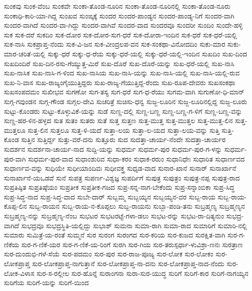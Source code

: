 ಸುಂಕವು
ಸುಂಕ-ವೆಂಬ
ಸುಂಕವೇ
ಸುಂಕಾ-ತೊಂಡ-ನೂರಿನ
ಸುಂಕಾ-ತೊಂಡ-ನೂರಿನಲ್ಲಿ
ಸುಂಕಾ-ತೊಂಡ-ನೂರು
ಸುಂಕಾಧಿ-ಕಾರಿ-ಯಾ-ಗಿದ್ದ
ಸುಂಖವ
ಸುಂಙ್ಕಕ್ಕೆ
ಸುಂದರ
ಸುಂದರ-ಪಾಂಡ್ಯನ
ಸುಂದರ-ಪಾಂಡ್ಯ-ನಿಗೆ
ಸುಂದರ-ವಾಗಿ
ಸುಂದರ-ವಾಗಿದೆ
ಸುಂದರ-ವಾ-ಗಿದ್ದು
ಸುಂದರ-ವಾಗಿವೆ
ಸುಂದರ-ವಾದ
ಸುಂದರವೂ
ಸುಂದರೀ
ಸುಂದಿಂ
ಸುಂದೇ-ಹಳ್ಳಿ
ಸುಕ
ಸುಕ-ದರೆ
ಸುಕದಿಂ
ಸುಕ-ದೋರ
ಸುಕ-ದೋರ-ಸುಗ-ಧರೆ
ಸುಕ-ದೋರಾ-ಇಂದಿನ
ಸುಕ-ಧರೆ
ಸುಕ-ಧರೆ-ಯಲ್ಲಿ
ಸುಕ-ನಾಸಿ
ಸುಕಪ್ರಾಪ್ತ-ನೆಂದು
ಸುಕ-ವಿ-ಜನ
ಸುಕ-ವೀಂದ್ರಲಪ-ವನ
ಸುಕ-ಸಂಕಥಾ-ವಿನೋದದಿಂ
ಸುಕು-ಮಾರ
ಸುಕು-ಮಾರ-ಚರಿತೆ-ಯಲ್ಲಿ
ಸುಕ್ಕು-ಧರೆ
ಸುಕ್ಕು-ಧ-ರೆಯ
ಸುಕ್ಕು-ಧರೆ-ಯಲ್ಲಿ
ಸುಕ್ಕು-ಧರೆ-ಯಲ್ಲಿ-ಇಂದಿನ
ಸುಖದಿಂ
ಸುಖ-ದಿಂದ
ಸುಖದಿಂದಿರೆ
ಸುಖ-ದಿನ-ರಸು-ಗೆಯ್ಯುತ್ತ-ಮಿರೆ
ಸುಖ-ದೊರೆ
ಸುಖ-ದೊರೆ-ಯನ್ನು
ಸುಖ-ಧರೆ-ಯಲ್ಲಿ
ಸುಖ-ನಾಸಿ
ಸುಖ-ನಾಸಿಕ
ಸುಖ-ನಾಸಿ-ಗ-ಳಿಂದ
ಸುಖ-ನಾಸಿಯ
ಸುಖ-ನಾಸಿ-ಯನ್ನು
ಸುಖ-ನಾಸಿ-ಯಲ್ಲಿ
ಸುಖ-ನಾಸಿ-ಯಲ್ಲಿ-ರುವ
ಸುಖ-ನಿ-ವಾಸ
ಸುಖ-ರಾಜ್ಯಂಗೈಯುತ್ತಿದ್ದರು
ಸುಖ-ರಾಜ್ಯ-ಗೆಯುತ್ತಿದ್ದ-ರೆಂದು
ಸುಖ-ರೂಪ-ದೇವರು
ಸುಖಸಂಕಥಾ
ಸುಖಸಂಪದಮಂ
ಸುಖೀಭವ
ಸುಗಣೋ
ಸುಗ-ತಸ್ಯ
ಸುಗ-ಧರೆ
ಸುಗ-ಧ-ರೆಯು
ಸುಗಮ-ವಾಗಿ
ಸುಗುಣೋ-ಧಿ-ಮಾನ್
ಸುಗ್ಗ-ಗವುಂಡನ
ಸುಗ್ಗ-ಗೌಂಡ
ಸುಗ್ಗಲ-ದೇವಿ
ಸುಚರಿತ್ರೆ
ಸುಚಿಸು-ಧನ್ವ
ಸುಜ್ಜ-ಲೂರಿನ
ಸುಜ್ಜ-ಲೂರಿನಲ್ಲಿದ್ದ
ಸುಜ್ಜ-ಲೂರು
ಸುಟ್ಟು-ಕೊಂಡರು
ಸುಟ್ಟು-ಕೊಳ್ಳುವಿಕೆ-ಯನ್ನು
ಸುಡೆ
ಸುಣ್ಣ-ದಲ್ಲಿ
ಸುಣ್ಣ-ಬಣ್ಣ
ಸುಣ್ಣ-ಬಣ್ಣ-ಗ-ಳಿಗೆ
ಸುಣ್ಣ-ಬಣ್ಣ-ವನ್ನು
ಸುಣ್ಣ-ಹರ-ಳಿನ-ಹಳ್ಳದ
ಸುತ
ಸುತಂ
ಸುತರು
ಸುತೆ
ಸುತ್ತ
ಸುತ್ತಣ
ಸುತ್ತ-ಮುತ್ತ
ಸುತ್ತ-ಮುತ್ತಲ
ಸುತ್ತ-ಮುತ್ತ-ಲಿನ
ಸುತ್ತ-ಮುತ್ತಲೂ
ಸುತ್ತ-ಲಿನ
ಸುತ್ತಲೂ
ಸುತ್ತ-ಳಿ-ಯದೆ
ಸುತ್ತಾ-ಲಯ
ಸುತ್ತಾ-ಲ-ಯದ
ಸುತ್ತಾ-ಲಯ-ವನ್ನು
ಸುತ್ತಿ
ಸುತ್ತಿ-ಕೊಂಡ
ಸುತ್ತಿನ
ಸುತ್ತಿರ್ದ್ದ
ಸುತ್ತು-ವರೆ-ದನು
ಸುತ್ತೂರು
ಸುದ
ಸುದತ್ತಾ-ಚಾರ್ಯ-ನೆಂದೇ
ಸುದತ್ತಾ-ಚಾರ್ಯರ
ಸುದರ್ಶನ
ಸುದರ್ಶನಾ-ಚಾರ್ಯ-ನಾದ
ಸುದ್ದಿ-ಯನ್ನು
ಸುಧರ್ಮ
ಸುಧರ್ಮ-ಪುರ
ಸುಧರ್ಮ-ಪುರ-ಗ-ಳನ್ನು
ಸುಧರ್ಮ-ಪುರ-ವಾಗಿ
ಸುಧರ್ಮ-ಪುರ-ವಾದ
ಸುಧಾಂಶುರಿವ
ಸುಧಾ-ಕರಂ
ಸುಧಾಕ-ರರುಂ
ಸುಧಾನಿಧೇಃ
ಸುಧಾರಿತ
ಸುಧಾರ್ಣವದ
ಸುಧಾರ್ಣವ-ವನ್ನು
ಸುಧಿಯೇ
ಸುಧೀಯಾಂದಿವಃ
ಸುಧೀವಕ್ತ್ರ
ಸುಧೃಡ-ವಾದ
ಸುನಾರ-ಖಾನೆ
ಸುನಾರ್
ಸುನಾರ್ಖಾನೆ
ಸುನಾರ್ಖಾನೆ-ಯಒಡವೆ
ಸುನೆ
ಸುಪತ್ರ
ಸುಪರ್ಣ-ವಿಶ್ವಜ್ಞ
ಸುಪರ್ದಿಗೆ
ಸುಪುತ್ರ
ಸುಪುತ್ರಂ
ಸುಪುತ್ರ-ನಪ್ಪ
ಸುಪುತ್ರ-ರಾದ
ಸುಪ್ರತಿಷ್ಠಿತ
ಸುಪ್ರತಿಷ್ಠೆಯಂ
ಸುಪ್ರತೀಕ
ಸುಪ್ರತೀಕ-ಗಜದ
ಸುಪ್ರ-ಸನ್ನ-ನಾಗ-ಬೇಕೆಂದು
ಸುಪ್ರ-ಸನ್ನಾಂಬಿಕಾ
ಸುಪ್ರ-ಸಿದ್ಧ
ಸುಪ್ರ-ಸಿದ್ಧ-ನಾದ
ಸುಪ್ರ-ಸಿದ್ಧ-ವಾದ
ಸುಬೇ-ದಾರ್
ಸುಬ್ಬಮ್ಮ
ಸುಬ್ಬಯ್ಯನ
ಸುಬ್ಬಯ್ಯನ-ವರ
ಸುಬ್ಬ-ರಾಯ
ಸುಬ್ಬ-ರಾಯ-ಕೊಪ್ಪ-ಲಿನ
ಸುಬ್ಬ-ರಾಯನ
ಸುಬ್ಬ-ರಾಯ-ನ-ಕೊಪ್ಪಲು
ಸುಬ್ಬ-ರಾಯನು
ಸುಬ್ಬಾ-ಪಂಡಿ-ತನು
ಸುಬ್ರಹ್ಮಣ್ಯ
ಸುಬ್ರಹ್ಮಣ್ಯನ
ಸುಬ್ರಹ್ಮಣ್ಯ-ನನ್ನು
ಸುಬ್ರಹ್ಮಣ್ಯ-ನೆಂಬ
ಸುಭಟರ
ಸುಭಟರಟ್ಟೆ-ಗಳಾ-ಡಲು
ಸುಭಟ-ರನ್ನು
ಸುಭಟ-ರಾ-ದಿತ್ಯನುಂ
ಸುಭದ್ರ-ವಾಗಿದೆ
ಸುಭದ್ರವೂ
ಸುಭದ್ರಸ್ಥಿತಿ-ಯಲ್ಲಿದ್ದು
ಸುಭಾಶ್
ಸುಮನಾ
ಸುಮಾ-ರಾಗಿ
ಸುಮಾ-ರಾದ
ಸುಮಾರಿಗೆ
ಸುಮಾರಿ-ನಲ್ಲಿ
ಸುಮಾರು
ಸುಮಿತ್ರೆ-ಯ-ರಂತೆ
ಸುಮ್ಮನೆ
ಸುರ
ಸುರಂಗ
ಸುರಂಗದ
ಸುರ-ಕರಿಯ
ಸುರ-ಕುಜದ
ಸುರಕ್ಷಿತ-ವಾಗಿ
ಸುರ-ಗ-ಣಿಕೆಯ
ಸುರ-ಗ-ಣಿಕೆ-ಯರ
ಸುರ-ಗ-ಣಿಕೆ-ಯ-ರಿಂಗೆ
ಸುರಗಿ
ಸುರ-ಗಿಯ
ಸುರ-ತರುಸ್ಪರ್ಧಾ-ಳುವಿಶ್ರಾ-ಣನಃ
ಸುರತ್ರಾಣ
ಸುರ-ದುಂದುಭಿ-ಗಳೆ-ಸೆಯೆ
ಸುರ-ಪದಮಂ
ಸುರ-ಪುರ
ಸುರ-ರಾಜ-ಪೂಜ್ಯ
ಸುರ-ಲೋಕ
ಸುರ-ಲೋಕಂ
ಸುರ-ಲೋಕಪ್ರಾಪ್ತ
ಸುರ-ಲೋಕಪ್ರಾಪ್ತ-ನಾಗುತ್ತಾನೆ
ಸುರ-ಲೋಕಪ್ರಾಪ್ತ-ನಾ-ದನು
ಸುರ-ಲೋಕಪ್ರಾಪ್ತ-ನಾದ-ನೆಂದು
ಸುರ-ಲೋಕ-ವಿಳಾಸ
ಸುರ-ಸ-ರಲ್ಲೀಲ
ಸುರ-ಹೊನ್ನೆ
ಸುರಾಂಗನಾ
ಸುರಾ-ಸುರ-ಯುದ್ಧ
ಸುರಿಗೆ
ಸುರಿಗೆ-ಕಾರ
ಸುರಿಗೆ-ನಾಗಯ್ಯನ
ಸುರಿಗೆಯ
ಸುರಿಗೆ-ಯನ್ನು
ಸುರಿಗೆ-ಯಿಂದ
